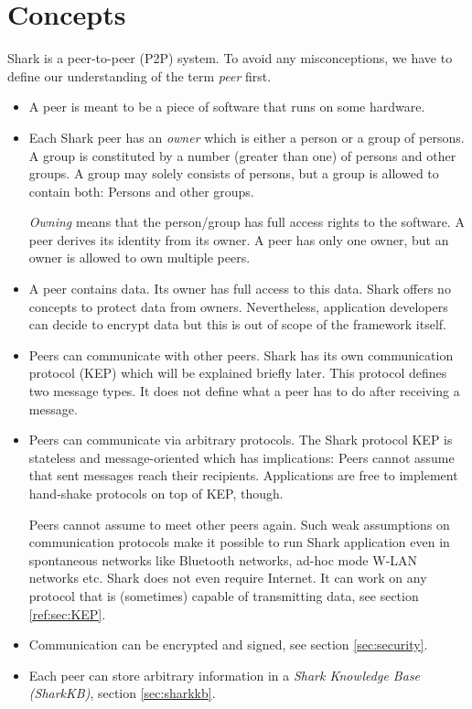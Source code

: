\chapter{Concepts}
Shark is a peer-to-peer (P2P) system. To avoid any misconceptions, we have to define our understanding of the term {\it peer} first.

\begin{itemize}
\item 
A peer is meant to be a piece of software that runs on some hardware.

\item
Each Shark peer has an {\it owner} which is either a person or a group of persons. A group is constituted by a number (greater than one) of persons and other groups. A group may solely consists of persons, but a group is allowed to contain both: Persons and other groups.

{\it Owning} means that the person/group has full access rights to the software. 
A peer derives its identity from its owner. A peer has only one owner, but an owner is allowed to own multiple peers. 

\item
A peer contains data. Its owner has full access to this data. Shark offers no concepts to protect data from owners. Nevertheless, application developers can decide to encrypt data but this is out of scope of the framework itself.

\item
Peers can communicate with other peers. Shark has its own communication protocol (KEP) which will be explained briefly later. This protocol defines two message types. It does not define what a peer has to do after receiving a message.

\item
Peers can communicate via arbitrary protocols. The Shark protocol KEP is stateless and message-oriented which has implications: Peers cannot assume that sent messages reach their recipients. Applications are free to implement hand-shake protocols on top of KEP, though.

Peers cannot assume to meet other peers again. Such weak assumptions on communication protocols make it possible to run Shark application even in spontaneous networks like Bluetooth networks, ad-hoc mode W-LAN networks etc. Shark does not even require Internet. It can work on any protocol that is (sometimes) capable of transmitting data, see section \ref{ref:sec:KEP}.

\item
Communication can be encrypted and signed, see section \ref{sec:security}.

\item
Each peer can store arbitrary information in a {\it Shark Knowledge Base (SharkKB)}, section \ref{sec:sharkkb}.


\end{itemize}

